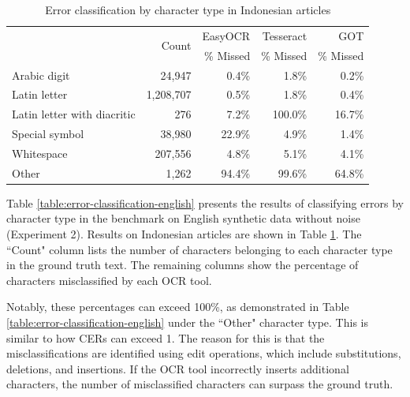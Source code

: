 \documentclass[12pt,oneside]{memoir}
\begin{document}
\begin{table}[ht]
    \caption{Error classification by character type in Indonesian articles}
    \label{table:error-classification-indonesian}
    \centering
    \begin{tabular}{lrrrr}
        \toprule
        & \multirow{2}{*}{Count} & EasyOCR & Tesseract & GOT\\
        & & \% Missed & \% Missed & \% Missed\\
        \midrule
        Arabic digit & 24,947 & 0.4\% & \cellcolor{LightRed!2}1.8\% & 0.2\%\\
        Latin letter & 1,208,707 & \cellcolor{LightRed!1}0.5\% & \cellcolor{LightRed!2}1.8\% & 0.4\%\\
        Latin letter with diacritic & 276 & \cellcolor{LightRed!7}7.2\% & \cellcolor{LightRed!100}100.0\% & \cellcolor{LightRed!17}16.7\%\\
        Special symbol & 38,980 & \cellcolor{LightRed!23}22.9\% & \cellcolor{LightRed!5}4.9\% & \cellcolor{LightRed!1}1.4\%\\
        Whitespace & 207,556 & \cellcolor{LightRed!5}4.8\% & \cellcolor{LightRed!5}5.1\% & \cellcolor{LightRed!4}4.1\%\\
        Other & 1,262 & \cellcolor{LightRed!94}94.4\% & \cellcolor{LightRed!100}99.6\% & \cellcolor{LightRed!65}64.8\%\\
        \bottomrule
    \end{tabular}
\end{table}

Table \ref{table:error-classification-english} presents the results of classifying errors by character type in the benchmark on English synthetic data without noise (Experiment 2). 
Results on Indonesian articles are shown in Table \ref{table:error-classification-indonesian}.
The ``Count" column lists the number of characters belonging to each character type in the ground truth text.
The remaining columns show the percentage of characters misclassified by each OCR tool.

Notably, these percentages can exceed 100\%, as demonstrated in Table \ref{table:error-classification-english} under the ``Other" character type.
This is similar to how CERs can exceed 1.
The reason for this is that the misclassifications are identified using edit operations, which include substitutions, deletions, and insertions. 
If the OCR tool incorrectly inserts additional characters, the number of misclassified characters can surpass the ground truth.
\end{document}
